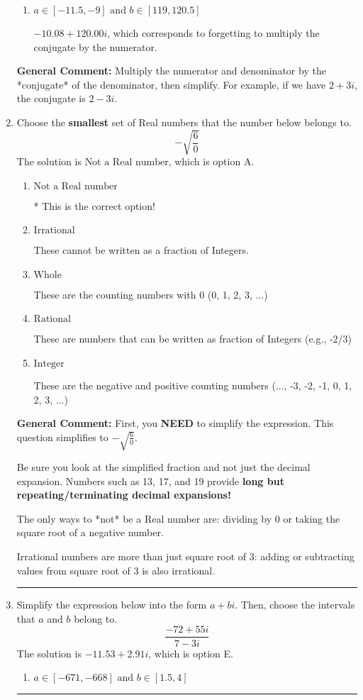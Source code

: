 \documentclass{extbook}[14pt]
\newcommand{\litem}[1]{\item #1

\rule{\textwidth}{0.4pt}}
\begin{document}
\begin{enumerate}
{\begin{enumerate}[label=\Alph*.]
 $-534.00  + 2.26 i$, which corresponds to forgetting to multiply the conjugate by the numerator and using a plus instead of a minus in the denominator.
\item \( a \in [-11.5, -9] \text{ and } b \in [119, 120.5] \)

 $-10.08  + 120.00 i$, which corresponds to forgetting to multiply the conjugate by the numerator.
\end{enumerate}

\textbf{General Comment:} Multiply the numerator and denominator by the *conjugate* of the denominator, then simplify. For example, if we have $2+3i$, the conjugate is $2-3i$.
}
\litem{
Choose the \textbf{smallest} set of Real numbers that the number below belongs to.
\[ -\sqrt{\frac{6}{0}} \]The solution is \( \text{Not a Real number} \), which is option A.\begin{enumerate}[label=\Alph*.]
\item \( \text{Not a Real number} \)

* This is the correct option!
\item \( \text{Irrational} \)

These cannot be written as a fraction of Integers.
\item \( \text{Whole} \)

These are the counting numbers with 0 (0, 1, 2, 3, ...)
\item \( \text{Rational} \)

These are numbers that can be written as fraction of Integers (e.g., -2/3)
\item \( \text{Integer} \)

These are the negative and positive counting numbers (..., -3, -2, -1, 0, 1, 2, 3, ...)
\end{enumerate}

\textbf{General Comment:} First, you \textbf{NEED} to simplify the expression. This question simplifies to $-\sqrt{\frac{6}{0}}$. 
 
 Be sure you look at the simplified fraction and not just the decimal expansion. Numbers such as 13, 17, and 19 provide \textbf{long but repeating/terminating decimal expansions!} 
 
 The only ways to *not* be a Real number are: dividing by 0 or taking the square root of a negative number. 
 
 Irrational numbers are more than just square root of 3: adding or subtracting values from square root of 3 is also irrational.
}
\litem{
Simplify the expression below into the form $a+bi$. Then, choose the intervals that $a$ and $b$ belong to.
\[ \frac{-72 + 55 i}{7 - 3 i} \]The solution is \( -11.53  + 2.91 i \), which is option E.\begin{enumerate}[label=\Alph*.]
\item \( a \in [-671, -668] \text{ and } b \in [1.5, 4] \)


\end{enumerate}}
\end{enumerate}
\end{document}
